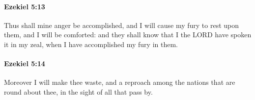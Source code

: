 		\paragraph{Ezekiel 5:13} %
			\label{EZEKIEL-5-13}

			Thus shall mine anger be accomplished, and I will cause my fury to rest upon them, and I will be comforted: and they shall know that I the LORD have spoken it in my zeal, when I have accomplished my fury in them.


		\paragraph{Ezekiel 5:14} %
			\label{EZEKIEL-5-14}

			Moreover I will make thee waste, and a reproach among the nations that are round about thee, in the sight of all that pass by.


